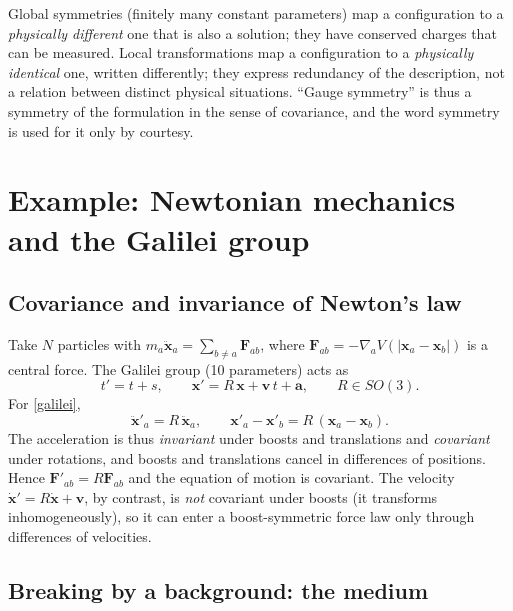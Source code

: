 \begin{remark}\label{rem:gauge}
Global symmetries (finitely many constant parameters) map a configuration to a
\emph{physically different} one that is also a solution; they have conserved
charges that can be measured. Local transformations map a configuration to
a \emph{physically identical} one, written differently; they express
redundancy of the description, not a relation between distinct physical
situations. ``Gauge symmetry'' is thus a symmetry of the formulation in the
sense of covariance, and the word symmetry is used for it only by courtesy.
\end{remark}

\section{Example: Newtonian mechanics and the Galilei group}
\label{sec:galilei}

\subsection{Covariance and invariance of Newton's law}

Take $N$ particles with $m_a\ddot{{\bm{x}}}_a=\sum_{b\ne a}\bm F_{ab}$, where
$\bm F_{ab}=-\nabla_{a}V(|{\bm{x}}_a-{\bm{x}}_b|)$ is a central force. The Galilei group
(10 parameters) acts as
\begin{equation}\label{galilei}
  t'=t+s,\qquad {\bm{x}}'=R\,{\bm{x}}+{\bm{v}}\,t+\bm a,\qquad R\in SO(3).
\end{equation}
For \eqref{galilei},
\begin{equation}
  \ddot{{\bm{x}}}'_a=R\,\ddot{{\bm{x}}}_a,\qquad
  {\bm{x}}'_a-{\bm{x}}'_b=R\,({\bm{x}}_a-{\bm{x}}_b).
\end{equation}
The acceleration is thus \emph{invariant} under boosts and translations and
\emph{covariant} under rotations, and boosts and translations cancel in
differences of positions. Hence $\bm F'_{ab}=R\bm F_{ab}$ and the equation of
motion is covariant. The velocity $\dot{\bm{x}}'=R\dot{\bm{x}}+{\bm{v}}$, by contrast, is
\emph{not} covariant under boosts (it transforms inhomogeneously), so it can
enter a boost-symmetric force law only through differences of velocities.

\subsection{Breaking by a background: the medium}

